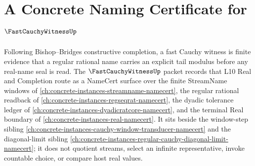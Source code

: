 \chapter{A Concrete Naming Certificate for $\FastCauchyWitnessUp$}
\label{ch:concrete-instances-fast-cauchy-witness-namecert}

Following Bishop--Bridges constructive completion, a fast Cauchy witness is finite evidence that a regular rational name carries an explicit tail modulus before any real-name seal is read. The $\FastCauchyWitnessUp$ packet records that L10 Real and Completion route as a NameCert surface over the finite StreamName windows of \autoref{ch:concrete-instances-streamname-namecert}, the regular rational readback of \autoref{ch:concrete-instances-regseqrat-namecert}, the dyadic tolerance ledger of \autoref{ch:concrete-instances-dyadicratcore-namecert}, and the terminal Real boundary of \autoref{ch:concrete-instances-real-namecert}. It sits beside the window-step sibling \autoref{ch:concrete-instances-cauchy-window-transducer-namecert} and the diagonal-limit sibling \autoref{ch:concrete-instances-regular-cauchy-diagonal-limit-namecert}; it does not quotient streams, select an infinite representative, invoke countable choice, or compare host real values.

